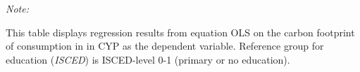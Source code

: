 \begin{table}[htbp!]
\begin{adjustbox}{width = 1\textwidth, max height = 0.95\textheight, center}
\begin{threeparttable}[b]
         \begin{tablenotes}\item \medskip \textit{Note:}
            \item This table displays regression results from equation OLS on the carbon footprint of consumption in  in CYP as the dependent variable.  Reference group for education (\textit{ISCED}) is ISCED-level 0-1 (primary or no education).
         \end{tablenotes}
      \end{threeparttable}
   \end{adjustbox}
\end{table}


